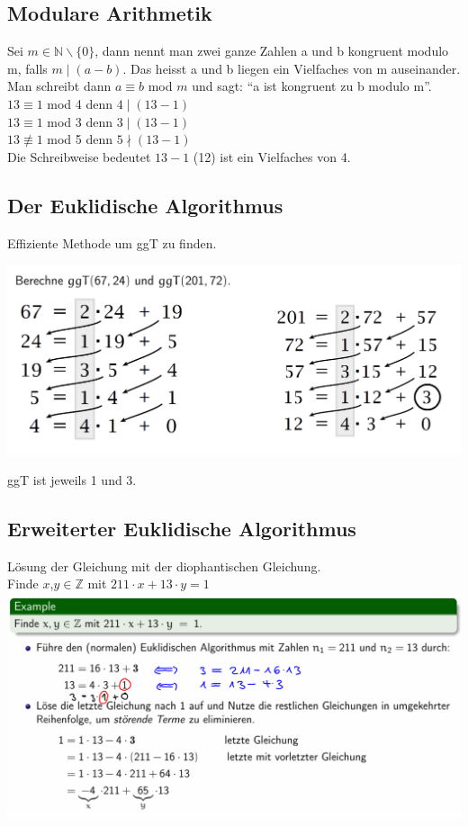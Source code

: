 \documentclass[12pt]{scrartcl}
\begin{document}
\subsection{Modulare Arithmetik}
Sei $m \in \mathbb{N} \backslash \{0\}$, dann nennt man zwei ganze Zahlen a und b kongruent modulo m, falls $m\mid (a - b)$.
Das heisst a und b liegen ein Vielfaches von m auseinander. Man schreibt dann $a \equiv b$ mod $m$ und sagt:
``a ist kongruent zu b modulo m''.\\

$13 \equiv 1$ mod 4 denn $4 \mid (13 - 1)$\\
$13 \equiv 1$ mod 3 denn $3 \mid (13 - 1)$\\
$13 \not\equiv  1$ mod 5 denn $5 \nmid (13 - 1)$\\

Die Schreibweise bedeutet $13 - 1$ (12) ist ein Vielfaches von 4.\\

\subsection{Der Euklidische Algorithmus}
Effiziente Methode um ggT zu finden.

\includegraphics[width=15cm]{img/euqlidic_algorithm.png}

ggT ist jeweils 1 und 3.


\subsection{Erweiterter Euklidische Algorithmus}
Lösung der Gleichung mit der diophantischen Gleichung.\\

Finde $x$,$y \in \mathbb{Z}$ mit $211 \cdot x + 13 \cdot y = 1$\\ 

\includegraphics[width=14cm]{img/erweiterter_euklidischer_algorithmus.png}
\end{document}
